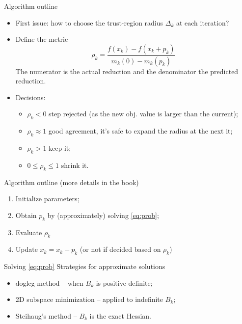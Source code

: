 \documentclass{beamer}
\begin{document}
\begin{frame}[allowframebreaks]{Algorithm outline}
	\begin{itemize}
		\item First issue: how to choose the trust-region radius $\Delta_k$ at each iteration?
		\item Define the metric
		\begin{equation}
			\rho_k = \frac{f(x_k) - f(x_k + p_k)}{m_k(0) - m_k(p_k)}
		\end{equation} 
		The numerator is the actual reduction and the denominator the predicted reduction.
		\item Decisions:
		\begin{itemize}
			\item $\rho_k < 0$ step rejected (as the new obj. value is larger than the current);
			\item $\rho_k \approx 1$ good agreement, it's safe to expand the radius at the next it;
			\item $\rho_k > 1$ keep it;
			\item $0 \leq \rho_k \leq 1 $ shrink it.
		\end{itemize}
	\end{itemize}
	\vspace{2cm}
	
	Algorithm outline (more details in the book)
	\begin{enumerate}
		\item Initialize parameters;
		\item Obtain $p_k$ by (approximately) solving \eqref{eq:prob};
		\item Evaluate $\rho_k$
		\item Update $x_k = x_k + p_k$ (or not if decided based on $\rho_k$)
	\end{enumerate}
\end{frame} 

\begin{frame}{Solving \eqref{eq:prob}}
	Strategies for approximate solutions
	\begin{itemize}
		\item dogleg method -- when $B_k$ is positive definite;
		\item 2D subspace minimization -- applied to indefinite $B_k$;
		\item Steihaug's method -- $B_k$ is the exact Hessian.
	\end{itemize}
\end{frame} 
\end{document}
